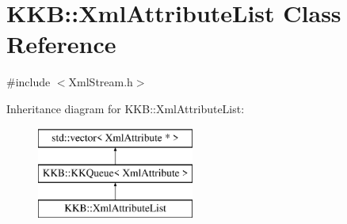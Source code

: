 \hypertarget{class_k_k_b_1_1_xml_attribute_list}{}\section{K\+KB\+:\+:Xml\+Attribute\+List Class Reference}
\label{class_k_k_b_1_1_xml_attribute_list}


{\ttfamily \#include $<$Xml\+Stream.\+h$>$}

Inheritance diagram for K\+KB\+:\+:Xml\+Attribute\+List\+:\begin{figure}[H]
\begin{center}
\leavevmode
\includegraphics[height=3.000000cm]{class_k_k_b_1_1_xml_attribute_list}
\end{center}
\end{figure}
